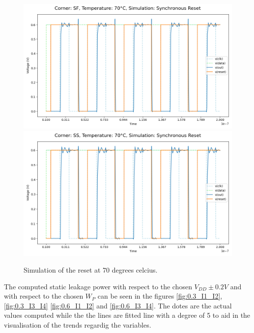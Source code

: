 \begin{figure}[H]
    \vspace{5pt}
    \includegraphics[height= 0.21\textheight]{figures/aimspice/0.600_0.1u_0.1u_0.3u_0.1u/functionality/SF70W3.png}
    \vspace{5pt}
    \includegraphics[height= 0.21\textheight]{figures/aimspice/0.600_0.1u_0.1u_0.3u_0.1u/functionality/SS70W3.png}
    \caption{Simulation of the reset at 70 degrees celcius.}
    \label{fig:aimspice_W3_70}
\end{figure}

The computed static leakage power with respect to the chosen $V_{DD}\pm 0.2V$ and with respect to the chosen $W_P$ can be seen in the figures \ref{fig:0.3_I1_I2}, \ref{fig:0.3_I3_I4} \ref{fig:0.6_I1_I2} and \ref{fig:0.6_I3_I4}. The dotes are the actual values computed while the the lines are fitted line with a degree of 5 to aid in the visualisation of the trends regardig the variables.


